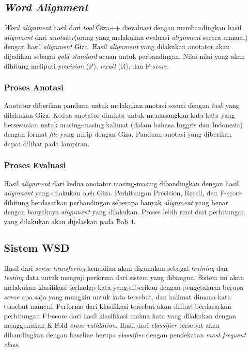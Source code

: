 \subsection{\textit{Word Alignment}}
\textit{Word alignment} hasil dari \textit{tool} Giza++ dievaluasi dengan membandingkan hasil \textit{alignment} dari \textit{anotator}(orang yang melakukan evaluasi \textit{alignment} secara manual) dengan hasil \textit{alignment} Giza. Hasil \textit{alignment} yang dilakukan anotator akan dijadikan sebagai \textit{gold standard} acuan untuk perbandingan. Nilai-nilai yang akan dihitung meliputi \textit{precision} (P), \textit{recall} (R), dan F-\textit{score}. 

\subsubsection{Proses Anotasi}

Anotator diberikan panduan untuk melakukan anotasi sesuai dengan \textit{task} yang dilakukan Giza. Kedua anotator diminta untuk memasangkan kata-kata yang bersesuaian untuk masing-masing kalimat (dalam bahasa Inggris dan Indonesia) dengan format \textit{file} yang mirip dengan Giza. Panduan anotasi yang diberikan dapat dilihat pada lampiran.

\subsubsection{Proses Evaluasi}

Hasil \textit{alignment} dari kedua anotator masing-masing dibandingkan dengan hasil \textit{alignment} yang dilakukan oleh Giza. Perhitungan Precision, Recall, dan F-score dihitung berdasarkan perbandingan seberapa banyak \textit{alignment} yang benar dengan banyaknya \textit{alignment} yang dilakukan. Proses lebih rinci dari perhitungan yang dilakukan akan dijelaskan pada Bab 4.

\subsection{Sistem WSD}
Hasil dari \textit{sense transfering} kemudian akan digunakan sebagai \textit{training} dan \textit{testing} data untuk menguji performa dari sistem yang dibangun. 
Sistem ini akan melakukan klasifikasi terhadap kata yang diberikan dengan pengetahuan berupa \textit{sense} apa saja yang mungkin untuk kata tersebut, dan kalimat dimana kata tersebut muncul. Performa dari klasifikasi tersebut akan dilihat berdasarkan perhitungan F1-score dari hasil klasifikasi makna kata yang dilakukan dengan menggunakan K-Fold \textit{cross validation}. Hasil dari \textit{classifier} tersebut akan dibandingkan dengan baseline berupa \textit{classifier} dengan pendekatan \textit{most frequent class}.